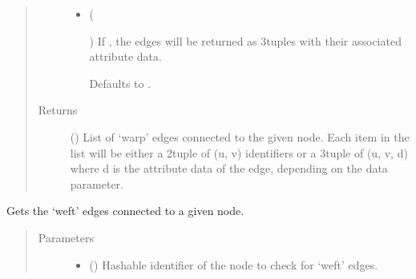\documentclass[letterpaper,10pt,english]{sphinxmanual}
\begin{document}
\begin{fulllineitems}
\begin{fulllineitems}
\begin{quote}
\begin{description}
\begin{itemize}
\item {} 
 (%
\begin{footnote}[101]\sphinxAtStartFootnote
{}
%
\end{footnote}\sphinxstyleliteralemphasis{\sphinxupquote{, }}) \textendash{} 
If , the edges will be returned as 3\sphinxhyphen{}tuples with their
associated attribute data.

Defaults to .


\end{itemize}

\item[{Returns}] \leavevmode
{} () \textendash{} List of ‘warp’ edges connected to the given node. Each item in the
list will be either a 2\sphinxhyphen{}tuple of (u, v) identifiers or a 3\sphinxhyphen{}tuple
of (u, v, d) where d is the attribute data of the edge, depending
on the data parameter.

\end{description}\end{quote}

\end{fulllineitems}


\begin{fulllineitems}
\label{\detokenize{cockatoo:cockatoo.KnitNetworkBase.node_weft_edges}}
Gets the ‘weft’ edges connected to a given node.
\begin{quote}\begin{description}
\item[{Parameters}] \leavevmode\begin{itemize}
\item {} 
 () \textendash{} Hashable identifier of the node to check for ‘weft’ edges.


\end{itemize}
\end{description}
\end{quote}
\end{fulllineitems}
\end{fulllineitems}
\end{document}
